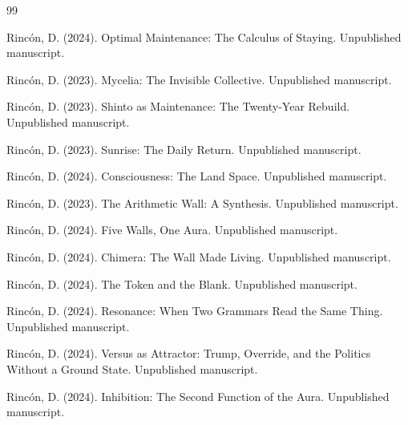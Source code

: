 \documentclass[12pt]{article}
\theoremstyle{definition}
\theoremstyle{remark}
\begin{document}
\begin{thebibliography}{99}

 Rincón, D. (2024). Optimal Maintenance: The Calculus of Staying. Unpublished manuscript.

 Rincón, D. (2023). Mycelia: The Invisible Collective. Unpublished manuscript.

 Rincón, D. (2023). Shinto as Maintenance: The Twenty-Year Rebuild. Unpublished manuscript.

 Rincón, D. (2023). Sunrise: The Daily Return. Unpublished manuscript.

 Rincón, D. (2024). Consciousness: The Land Space. Unpublished manuscript.

 Rincón, D. (2023). The Arithmetic Wall: A Synthesis. Unpublished manuscript.

 Rincón, D. (2024). Five Walls, One Aura. Unpublished manuscript.

 Rincón, D. (2024). Chimera: The Wall Made Living. Unpublished manuscript.

 Rincón, D. (2024). The Token and the Blank. Unpublished manuscript.

 Rincón, D. (2024). Resonance: When Two Grammars Read the Same Thing. Unpublished manuscript.

 Rincón, D. (2024). Versus as Attractor: Trump, Override, and the Politics Without a Ground State. Unpublished manuscript.

 Rincón, D. (2024). Inhibition: The Second Function of the Aura. Unpublished manuscript.

\end{thebibliography}
\end{document}

